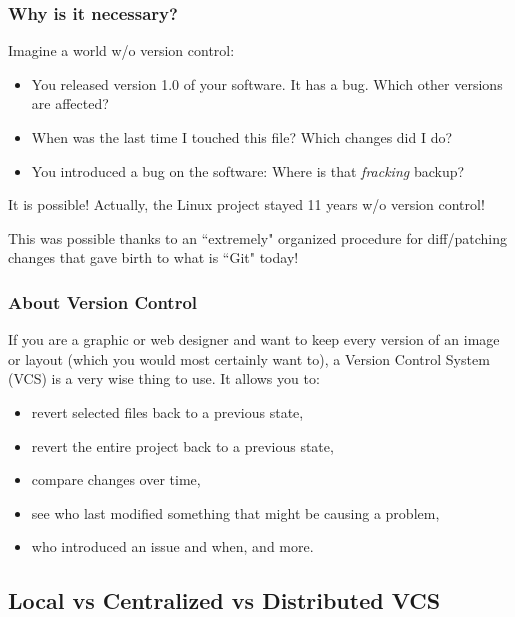 \begin{frame}
  \frametitle{Why is it necessary?}

  Imagine a world w/o version control:

  \begin{itemize}
    \item You released version 1.0 of your software. It has a bug. Which other
      versions are affected?
    \item When was the last time I touched this file? Which changes did I do?
    \item You introduced a bug on the software: Where is that \textit{fracking}
      backup?
  \end{itemize}

  \begin{alertblock}{It is possible!}
    Actually, the Linux project stayed 11 years w/o version control!

    \vspace{1em}

    This was possible thanks to an ``extremely" organized procedure for
    diff/patching changes that gave birth to what is ``Git" today!
  \end{alertblock}

\end{frame}

\begin{frame}
  \frametitle{About Version Control}

  If you are a graphic or web designer and want to keep every version of an image or layout (which you would most certainly want to), a Version Control System (VCS) is a very wise thing to use. It allows you to:
  
  \begin{itemize}
   \item revert selected files back to a previous state, 
   \item revert the entire project back to a previous state, 
   \item compare changes over time, 
   \item see who last modified something that might be causing a problem, 
   \item who introduced an issue and when, and more. 
  \end{itemize}
\end{frame}

\subsection{Local vs Centralized vs Distributed VCS}

